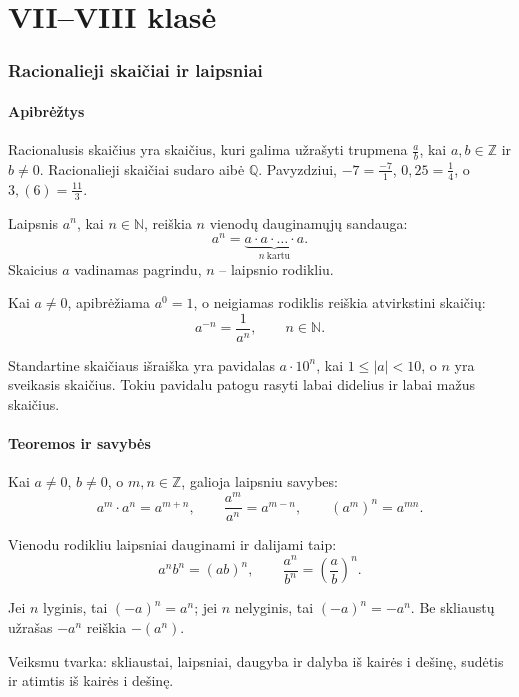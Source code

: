 \part{VII--VIII klasė}

\section{Racionalieji skaičiai ir laipsniai}\label{sec:racionalieji-skaiciai-ir-laipsniai}

\subsection{Apibrėžtys}
\begin{apibreztis}
Racionalusis skaičius yra skaičius, kuri galima užrašyti trupmena $\frac{a}{b}$, kai $a,b\in\mathbb{Z}$ ir $b\ne0$. Racionalieji skaičiai sudaro aibė $\mathbb{Q}$. Pavyzdziui, $-7=\frac{-7}{1}$, $0{,}25=\frac14$, o $3{,}(6)=\frac{11}{3}$.
\end{apibreztis}
\begin{apibreztis}
Laipsnis $a^n$, kai $n\in\mathbb{N}$, reiškia $n$ vienodų dauginamųjų sandauga:
\[
a^n=\underbrace{a\cdot a\cdot\ldots\cdot a}_{n\ \text{kartu}}.
\]
Skaicius $a$ vadinamas pagrindu, $n$ -- laipsnio rodikliu.
\end{apibreztis}
\begin{apibreztis}
Kai $a\ne0$, apibrėžiama $a^0=1$, o neigiamas rodiklis reiškia atvirkstini skaičių:
\[
a^{-n}=\frac{1}{a^n},\qquad n\in\mathbb{N}.
\]
\end{apibreztis}
\begin{apibreztis}
Standartine skaičiaus išraiška yra pavidalas $a\cdot10^n$, kai $1\le |a|<10$, o $n$ yra sveikasis skaičius. Tokiu pavidalu patogu rasyti labai didelius ir labai mažus skaičius.
\end{apibreztis}

\subsection{Teoremos ir savybės}
\begin{savybe}
Kai $a\ne0$, $b\ne0$, o $m,n\in\mathbb{Z}$, galioja laipsniu savybes:
\[
a^m\cdot a^n=a^{m+n},\qquad \frac{a^m}{a^n}=a^{m-n},\qquad (a^m)^n=a^{mn}.
\]
\end{savybe}
\begin{savybe}
Vienodu rodikliu laipsniai dauginami ir dalijami taip:
\[
a^n b^n=(ab)^n,\qquad \frac{a^n}{b^n}=\left(\frac{a}{b}\right)^n.
\]
\end{savybe}
\begin{savybe}
Jei $n$ lyginis, tai $(-a)^n=a^n$; jei $n$ nelyginis, tai $(-a)^n=-a^n$. Be skliaustų užrašas $-a^n$ reiškia $-(a^n)$.
\end{savybe}
\begin{pastaba}
Veiksmu tvarka: skliaustai, laipsniai, daugyba ir dalyba iš kairės i dešinę, sudėtis ir atimtis iš kairės i dešinę.
\end{pastaba}

